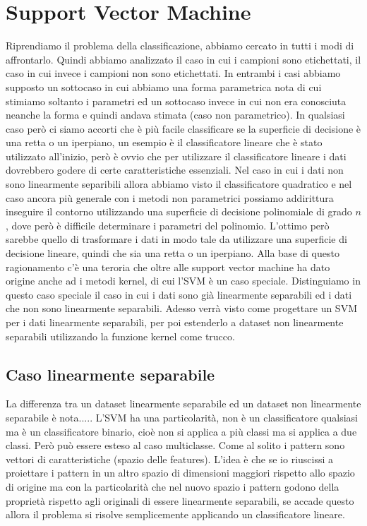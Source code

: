 %
%
%

\chapter{Support Vector Machine}

Riprendiamo il problema della classificazione, abbiamo cercato in tutti i modi di affrontarlo. Quindi abbiamo analizzato il caso in cui i campioni sono etichettati, il caso in cui invece i campioni non sono etichettati. In entrambi i casi abbiamo supposto un sottocaso in cui abbiamo una forma parametrica nota di cui stimiamo soltanto i parametri ed un sottocaso invece in cui non era conosciuta neanche la forma e quindi andava stimata (caso non parametrico). In qualsiasi caso però ci siamo accorti che è più facile classificare se la superficie di decisione è una retta o un iperpiano, un esempio è il classificatore lineare che è stato utilizzato all'inizio, però è ovvio che per utilizzare il classificatore lineare i dati dovrebbero godere di certe caratteristiche essenziali. Nel caso in cui i dati non sono linearmente separibili allora abbiamo visto il classificatore quadratico e nel caso ancora più generale con i metodi non parametrici possiamo addirittura inseguire il contorno utilizzando una superficie di decisione polinomiale di grado $n$, dove però è difficile determinare i parametri del polinomio. L'ottimo però sarebbe quello di trasformare i dati in modo tale da utilizzare una superficie di decisione lineare, quindi che sia una retta o un iperpiano.  Alla base di questo ragionamento c'è una teroria che oltre alle support vector machine ha dato origine anche ad i metodi kernel, di cui l'SVM è un caso speciale. Distinguiamo in questo caso speciale il caso in cui i dati sono già linearmente separabili ed i dati che non sono linearmente separabili. Adesso verrà visto come progettare un SVM per i dati linearmente separabili, per poi estenderlo a dataset non linearmente separabili utilizzando la funzione kernel come trucco. \\

\section{Caso linearmente separabile}
\noindent La differenza tra un dataset linearmente separabile ed un dataset non linearmente separabile è nota..... L'SVM ha una particolarità, non è un classificatore qualsiasi ma è un classificatore binario, cioè non si applica a più classi ma si applica a due classi. Però può essere esteso al caso multiclasse. Come al solito i pattern sono vettori di caratteristiche (spazio delle features). L'idea è che se io riuscissi a proiettare i pattern in un altro spazio di dimensioni maggiori rispetto allo spazio di origine ma con la particolarità che nel nuovo spazio i pattern godono della proprietà rispetto agli originali di essere linearmente separabili, se accade questo allora il problema si risolve semplicemente applicando un classificatore lineare.\\

